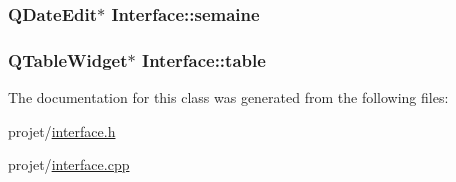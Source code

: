 \subsubsection[{semaine}]{\setlength{\rightskip}{0pt plus 5cm}Q\+Date\+Edit$\ast$ Interface\+::semaine\hspace{0.3cm}{\ttfamily [private]}}\label{class_interface_ac4ca6cf95990077c3c695f54b9340d46}
\hypertarget{class_interface_add370ece6c97151da99ebab84362c6a1}{}
\subsubsection[{table}]{\setlength{\rightskip}{0pt plus 5cm}Q\+Table\+Widget$\ast$ Interface\+::table\hspace{0.3cm}{\ttfamily [private]}}\label{class_interface_add370ece6c97151da99ebab84362c6a1}


The documentation for this class was generated from the following files\+:\begin{DoxyCompactItemize}
\item 
projet/\hyperlink{interface_8h}{interface.\+h}\item 
projet/\hyperlink{interface_8cpp}{interface.\+cpp}\end{DoxyCompactItemize}
